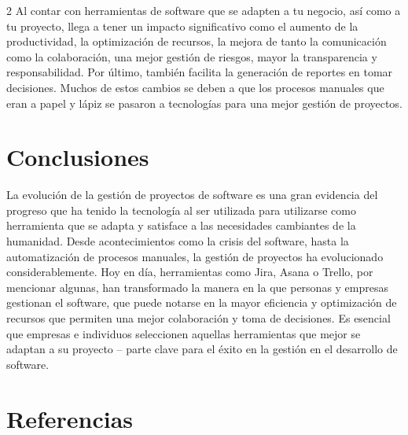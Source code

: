 \documentclass[12pt,spanish,Letterpaper,openany]{book}
\begin{document}
\begin {multicols}{2}
Al contar con herramientas de software que se adapten a tu negocio, así como a tu proyecto, llega a tener un impacto significativo como el aumento de la productividad, la optimización de recursos, la mejora de tanto la comunicación como la colaboración, una mejor gestión de riesgos, mayor la transparencia y responsabilidad. Por último, también facilita la generación de reportes en tomar decisiones. Muchos de estos cambios se deben a que los procesos manuales que eran a papel y lápiz se pasaron a tecnologías para una mejor gestión de proyectos.

\hypertarget{conclusiones-7}{%
\section{Conclusiones}\label{conclusiones-7}}

La evolución de la gestión de proyectos de software es una gran evidencia del progreso que ha tenido la tecnología al ser utilizada para utilizarse como herramienta que se adapta y satisface a las necesidades cambiantes de la humanidad. Desde acontecimientos como la crisis del software, hasta la automatización de procesos manuales, la gestión de proyectos ha evolucionado considerablemente. Hoy en día, herramientas como Jira, Asana o Trello, por mencionar algunas, han transformado la manera en la que personas y empresas gestionan el software, que puede notarse en la mayor eficiencia y optimización de recursos que permiten una mejor colaboración y toma de decisiones. Es esencial que empresas e individuos seleccionen aquellas herramientas que mejor se adaptan a su proyecto -- parte clave para el
éxito en la gestión en el desarrollo de software.

\hypertarget{referencias-6}{%
\section{Referencias}\label{referencias-6}}


\end{multicols}
\end{document}
